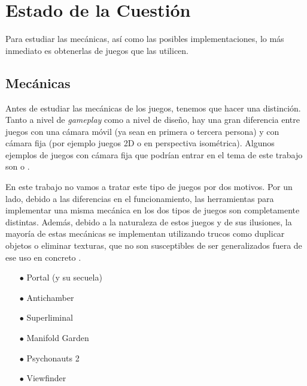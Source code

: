\chapter{Estado de la Cuestión}
\label{cap:estadoDeLaCuestion}

\begin{resumen}
Para estudiar las mecánicas, así como las posibles implementaciones, lo más inmediato es obtenerlas de juegos que las utilicen.
\end{resumen}

\section{Mecánicas}

Antes de estudiar las mecánicas de los juegos, tenemos que hacer una distinción. Tanto a nivel de \textit{gameplay} como a nivel de diseño, hay una gran diferencia entre juegos con una cámara móvil (ya sean en primera o tercera persona) y con cámara fija (por ejemplo juegos 2D o en perspectiva isométrica). Algunos ejemplos de juegos con cámara fija que podrían entrar en el tema de este trabajo son \cite{fez} o \cite{monument_valley}.

En este trabajo no vamos a tratar este tipo de juegos por dos motivos. Por un lado, debido a las diferencias en el funcionamiento, las herramientas para implementar una misma mecánica en los dos tipos de juegos son completamente distintas. Además, debido a la naturaleza de estos juegos y de sus ilusiones, la mayoría de estas mecánicas se implementan utilizando trucos como duplicar objetos o eliminar texturas, que no son susceptibles de ser generalizados fuera de ese uso en concreto \citep{monument_valley_video}.


\begin{multicols}{2}
	\begin{itemize}
		\item[$\bullet$] Portal (y su secuela)
		\item[$\bullet$] Antichamber
		\item[$\bullet$] Superliminal
		\item[$\bullet$] Manifold Garden
		\item[$\bullet$] Psychonauts 2
		\item[$\bullet$] Viewfinder
	\end{itemize}
\end{multicols}

